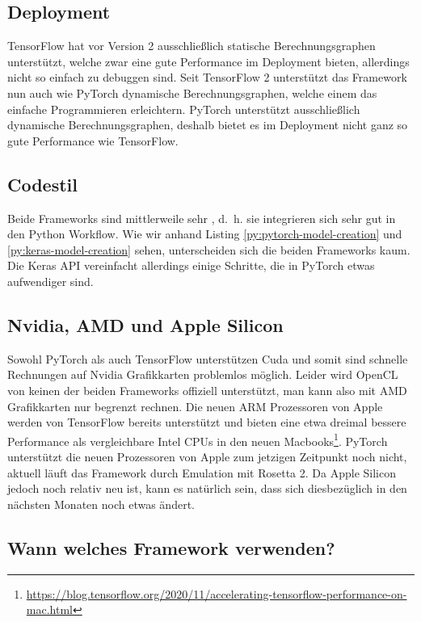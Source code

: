 \subsection{Deployment}
TensorFlow hat vor Version 2 ausschließlich statische Berechnungsgraphen unterstützt, welche zwar eine gute Performance im Deployment bieten, 
allerdings nicht so einfach zu debuggen sind. Seit TensorFlow 2 unterstützt das Framework nun auch wie PyTorch dynamische Berechnungsgraphen, 
welche einem das einfache Programmieren erleichtern. PyTorch unterstützt ausschließlich dynamische Berechnungsgraphen, deshalb bietet es im 
Deployment nicht ganz so gute Performance wie TensorFlow. 

\subsection{Codestil}
Beide Frameworks sind mittlerweile sehr , d.~h. sie integrieren sich sehr gut in den Python Workflow. 
Wie wir anhand Listing \ref{py:pytorch-model-creation} und \ref{py:keras-model-creation} sehen, unterscheiden sich die beiden Frameworks kaum. 
Die Keras API vereinfacht allerdings einige Schritte, die in PyTorch etwas aufwendiger sind. 

\subsection{Nvidia, AMD und Apple Silicon}
Sowohl PyTorch als auch TensorFlow unterstützen Cuda und somit sind schnelle Rechnungen auf Nvidia Grafikkarten problemlos möglich. 
Leider wird OpenCL von keinen der beiden Frameworks offiziell unterstützt, man kann also mit AMD Grafikkarten nur begrenzt rechnen.
Die neuen ARM Prozessoren von Apple werden von TensorFlow bereits unterstützt und bieten eine etwa dreimal bessere Performance als 
vergleichbare Intel CPUs in den neuen Macbooks\footnote{\url{https://blog.tensorflow.org/2020/11/accelerating-tensorflow-performance-on-mac.html}}.
PyTorch unterstützt die neuen Prozessoren von Apple zum jetzigen Zeitpunkt noch nicht, aktuell läuft das Framework durch Emulation mit Rosetta 2.
Da Apple Silicon jedoch noch relativ neu ist, kann es natürlich sein, dass sich diesbezüglich in den nächsten Monaten noch etwas ändert.

\subsection{Wann welches Framework verwenden?}

